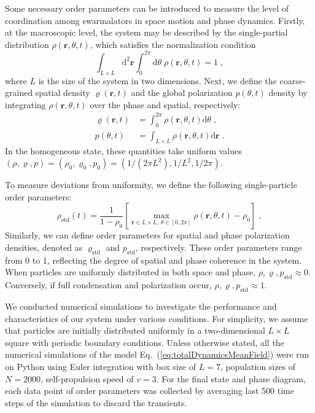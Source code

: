 \documentclass{article}
\begin{document}
Some necessary order parameters can be introduced to measure the level of coordination among swarmalators in space motion and phase dynamics. Firstly, at the macroscopic level, the system may be described by the single-partial distribution $\rho \left( \mathbf{r},\theta ,t \right) $, which satisfies the normalization condition
\begin{equation}
    \int_{L\times L}{\mathrm{d}^2\mathbf{r}\int_0^{2\pi}{\mathrm{d}\theta \;\rho \left( \mathbf{r},\theta ,t \right)}}=1\;,
\end{equation}
where $L$ is the size of the system in two dimensions. Next, we define the coarse-grained spatial density $\varrho \left( \mathbf{r}, t \right) $ and the global polarization $p(\theta, t)$ density by integrating $\rho\left( \mathbf{r},\theta ,t \right)$ over the phase and spatial, respectively:
\begin{subequations}
    \begin{align}
        \varrho \left( \mathbf{r},t \right)& =\int_0^{2\pi}{\rho \left( \mathbf{r},\theta ,t \right) \mathrm{d}\theta}\;,\\
        p\left( \theta ,t \right) & =\int_{L\times L}{\rho \left( \mathbf{r},\theta ,t \right) \mathrm{d}\mathbf{r}}\;.
    \end{align}
\end{subequations}
In the homogeneous state, these quantities take uniform values $\left( \rho ,\varrho ,p \right) =\left( \rho _0,\varrho _0,p_0 \right) =\left( 1/\left( 2\pi L^2 \right) ,1/L^2,1/2\pi \right) $.

To measure deviations from uniformity, we define the following single-particle order parameters:
\begin{equation}
    \rho _{\mathrm{std}}(t)=\frac{1}{1-\rho _0}\left[ \max_{\mathbf{r}\in L\times L,\ \theta \in \left[ 0,2\pi \right]} \rho \left( \mathbf{r},\theta ,t \right) -\rho _0 \right]  \;,
\end{equation}
Similarly, we can define order parameters for spatial and phase polarization densities, denoted as $\varrho _{\mathrm{std}}$ and $p_{\mathrm{std}}$, respectively.
These order parameters range from 0 to 1, reflecting the degree of spatial and phase coherence in the system. When particles are uniformly distributed in both space and phase, $\rho ,\varrho ,p_{\mathrm{std}} \approx 0$. Conversely, if full condensation and polarization occur, $\rho ,\varrho ,p_{\mathrm{std}}\approx 1$.

We conducted numerical simulations to investigate the performance and characteristics of our system under various conditions.
For simplicity, we assume that particles are initially distributed uniformly in a two-dimensional $L\times L$ square with periodic boundary conditions.
Unless otherwise stated, all the numerical simulations of the model Eq.~(\ref{eq:totalDynamicsMeanField}) were run on Python using Euler integration with box size of $L=7$, population sizes of $N=2000$, self-propulsion speed of $v=3$. 
For the final state and phase diagram, each data point of order parameters was collected by averaging last 500 time steps of the simulation to discard the transients.
 
\end{document}
